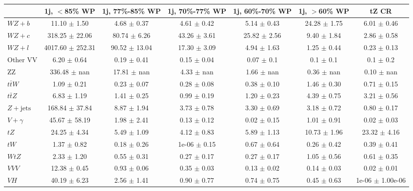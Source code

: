  \begin{table}[H]
\begin{center}
\begin{tabular}{|l|S|S|S|S|S|S|}
\hline 
 & {1j, $<$85\% WP} & {1j, 77\%-85\% WP} & {1j, 70\%-77\% WP} & {1j, 60\%-70\% WP} & {1j, $>$60\% WP} & {tZ CR}\\
\hline 
  $WZ + b$   & 11.10 $\pm$ 1.50 & 4.68 $\pm$ 0.37 & 4.61 $\pm$ 0.42 & 5.14 $\pm$ 0.43 & 24.28 $\pm$ 1.75 & 6.01 $\pm$ 0.46 \\ 
  $WZ + c$   & 318.25 $\pm$ 22.06 & 80.74 $\pm$ 6.26 & 43.26 $\pm$ 3.61 & 25.82 $\pm$ 2.56 & 9.40 $\pm$ 1.84 & 2.86 $\pm$ 0.58 \\ 
  $WZ + l$   & 4017.60 $\pm$ 252.31 & 90.52 $\pm$ 13.04 & 17.30 $\pm$ 3.09 & 4.94 $\pm$ 1.63 & 1.25 $\pm$ 0.44 & 0.23 $\pm$ 0.13 \\ 
  Other VV   & 6.20 $\pm$ 0.64 & 0.19 $\pm$ 0.41 & 0.15 $\pm$ 0.04 & 0.07 $\pm$ 0.1 & 0.1 $\pm$ 0.1 & 0.1 $\pm$ 0.2 \\ 
  ZZ   & 336.48 $\pm$ nan & 17.81 $\pm$ nan & 4.33 $\pm$ nan & 1.66 $\pm$ nan & 0.36 $\pm$ nan & 0.10 $\pm$ nan \\ 
  $t\bar{t}W$   & 1.09 $\pm$ 0.21 & 0.23 $\pm$ 0.07 & 0.28 $\pm$ 0.08 & 0.38 $\pm$ 0.10 & 1.46 $\pm$ 0.30 & 0.71 $\pm$ 0.15 \\ 
  $t\bar{t}Z$   & 6.83 $\pm$ 1.19 & 1.41 $\pm$ 0.25 & 0.99 $\pm$ 0.19 & 1.20 $\pm$ 0.23 & 4.39 $\pm$ 0.75 & 3.21 $\pm$ 0.56 \\ 
   $Z+\text{jets}$   & 168.84 $\pm$ 37.84 & 8.87 $\pm$ 1.94 & 3.73 $\pm$ 0.78 & 3.30 $\pm$ 0.69 & 3.18 $\pm$ 0.72 & 0.80 $\pm$ 0.17 \\ 
   $V+\gamma$   & 45.67 $\pm$ 58.19 & 1.98 $\pm$ 2.41 & 0.13 $\pm$ 0.12 & 0.02 $\pm$ 0.15 & 1.01 $\pm$ 0.91 & 0.02 $\pm$ 0.03 \\ 
  $tZ$   & 24.25 $\pm$ 4.34 & 5.49 $\pm$ 1.09 & 4.12 $\pm$ 0.83 & 5.89 $\pm$ 1.13 & 10.73 $\pm$ 1.96 & 23.32 $\pm$ 4.16 \\ 
  $tW$   & 1.37 $\pm$ 0.82 & 0.18 $\pm$ 0.26 & 1e-06 $\pm$ 0.15 & 0.67 $\pm$ 0.64 & 0.26 $\pm$ 0.42 & 0.39 $\pm$ 0.41 \\ 
  $WtZ$   & 2.33 $\pm$ 1.20 & 0.55 $\pm$ 0.31 & 0.27 $\pm$ 0.17 & 0.27 $\pm$ 0.17 & 1.05 $\pm$ 0.56 & 0.61 $\pm$ 0.35 \\ 
  $VVV$   & 12.38 $\pm$ 0.45 & 0.93 $\pm$ 0.06 & 0.35 $\pm$ 0.03 & 0.13 $\pm$ 0.02 & 0.14 $\pm$ 0.03 & 0.02 $\pm$ 0.01 \\ 
  $VH$   & 40.19 $\pm$ 6.23 & 2.56 $\pm$ 1.41 & 0.90 $\pm$ 0.77 & 0.74 $\pm$ 0.75 & 0.45 $\pm$ 0.63 & 1e-06 $\pm$ 1.00e-06 \\ 

\end{tabular}
\end{center}
\end{table}

